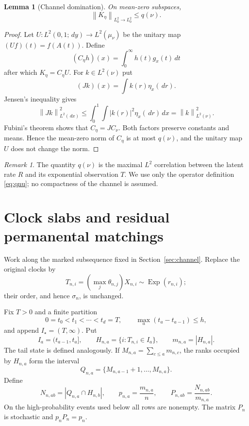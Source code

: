 \documentclass[11pt]{article}
\newtheorem{lemma}[theorem]{Lemma}
\theoremstyle{definition}
\theoremstyle{remark}
\newtheorem{remark}[theorem]{Remark}
\newcommand{\Exp}{\operatorname{Exp}}
\newcommand{\dd}{\,d}
\newcommand{\norm}[1]{\left\lVert#1\right\rVert}
\begin{document}
\begin{lemma}[Channel domination]
\label{lem:channel-domination}
On mean-zero subspaces,
\begin{equation}
  \norm{K_\eta}_{L^2_0\to L^2_0}\le q(\nu).
  \label{eq:marked-gap}
\end{equation}
\end{lemma}

\begin{proof}
Let $U:L^2(0,1;\dd y)\to L^2(\mu_\nu)$ be the unitary map
$(Uf)(t)=f(A(t))$.  Define
\[
 (C_\eta h)(x)=\int_0^\infty h(t)g_x(t)\dd t
\]
after which $K_\eta=C_\eta U$.
For $k\in L^2(\nu)$ put
\[
  (Jk)(x)=\int k(r)\eta_x(\dd r).
\]
Jensen's inequality gives
\[
 \norm{Jk}_{L^2(\dd x)}^2
 \le\int_0^1\int |k(r)|^2\eta_x(\dd r)\dd x
 =\norm{k}_{L^2(\nu)}^2.
\]
Fubini's theorem shows that $C_\eta=JC_\nu$.  Both factors preserve constants
and means.  Hence the mean-zero norm of $C_\eta$ is at most $q(\nu)$, and the
unitary map $U$ does not change the norm.
\end{proof}

\begin{remark}
The quantity $q(\nu)$ is the maximal $L^2$ correlation between the latent rate
$R$ and its exponential observation $T$.  We use only the operator definition
\eqref{eq:qnu}; no compactness of the channel is assumed.
\end{remark}

\section{Clock slabs and residual permanental matchings}
\label{sec:slabs}

Work along the marked subsequence fixed in Section~\ref{sec:channel}.  Replace
the original clocks by
\[
  T_{n,i}=(\max_j\theta_{n,j})X_{n,i}\sim\Exp(r_{n,i});
\]
their order, and hence $\sigma_n$, is unchanged.

Fix $T>0$ and a finite partition
\begin{equation}
  0=t_0<t_1<\cdots<t_d=T,
  \qquad \max_a(t_a-t_{a-1})\le h,
  \label{eq:time-partition}
\end{equation}
and append $I_\star=(T,\infty)$.  Put
\[
 I_a=(t_{a-1},t_a],\qquad
 H_{n,a}=\{i:T_{n,i}\in I_a\},\qquad
 m_{n,a}=|H_{n,a}|.
\]
The tail state is defined analogously.  If
$M_{n,a}=\sum_{c\le a}m_{n,c}$, the ranks occupied by $H_{n,a}$ form the
interval
\[
 Q_{n,a}=\{M_{n,a-1}+1,\ldots,M_{n,a}\}.
\]
Define
\begin{equation}
 N_{n,ab}=|Q_{n,a}\cap H_{n,b}|,
 \qquad p_{n,a}=\frac{m_{n,a}}n,
 \qquad P_{n,ab}=\frac{N_{n,ab}}{m_{n,a}}.
 \label{eq:finite-slab-matrix}
\end{equation}
On the high-probability events used below all rows are nonempty.  The matrix
$P_n$ is stochastic and $p_nP_n=p_n$.
\end{document}
